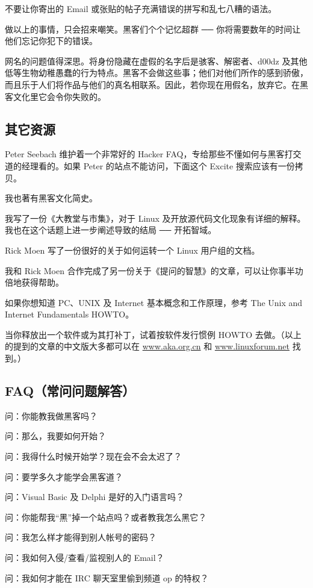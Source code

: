 不要让你寄出的 Email 或张贴的帖子充满错误的拼写和乱七八糟的语法。

做以上的事情，只会招来嘲笑。黑客们个个记忆超群 ── 你将需要数年的时间让他们忘记你犯下的错误。

网名的问题值得深思。将身份隐藏在虚假的名字后是骇客、解密者、d00dz 及其他低等生物幼稚愚蠢的行为特点。黑客不会做这些事；他们对他们所作的感到骄傲，而且乐于人们将作品与他们的真名相联系。因此，若你现在用假名，放弃它。在黑客文化里它会令你失败的。


\subsection{其它资源}
Peter Seebach 维护着一个非常好的 Hacker FAQ，专给那些不懂如何与黑客打交道的经理看的。如果 Peter 的站点不能访问，下面这个 Excite 搜索应该有一份拷贝。

我也著有黑客文化简史。

我写了一份《大教堂与市集》，对于 Linux 及开放源代码文化现象有详细的解释。我也在这个话题上进一步阐述导致的结局 ── 开拓智域。

Rick Moen 写了一份很好的关于如何运转一个 Linux 用户组的文档。

我和 Rick Moen 合作完成了另一份关于《提问的智慧》的文章，可以让你事半功倍地获得帮助。

如果你想知道 PC、UNIX 及 Internet 基本概念和工作原理，参考 The Unix and Internet Fundamentals HOWTO。

当你释放出一个软件或为其打补丁，试着按软件发行惯例 HOWTO 去做。（以上的提到的文章的中文版大多都可以在 \url{www.aka.org.cn} 和 \url{www.linuxforum.net} 找到。）


\subsection{FAQ（常问问题解答）}
问：你能教我做黑客吗？

问：那么，我要如何开始？

问：我得什么时候开始学？现在会不会太迟了？

问：要学多久才能学会黑客道？

问：Visual Basic 及 Delphi 是好的入门语言吗？

问：你能帮我“黑”掉一个站点吗？或者教我怎么黑它？

问：我怎么样才能得到别人帐号的密码？

问：我如何入侵/查看/监视别人的 Email？

问：我如何才能在 IRC 聊天室里偷到频道 op 的特权？

